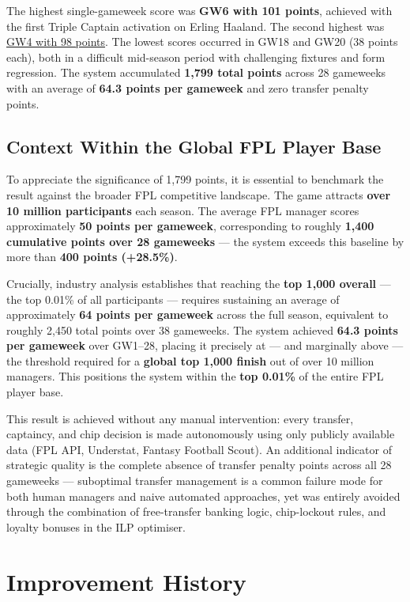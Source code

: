 The highest single-gameweek score was \textbf{GW6 with 101 points}, achieved with the first Triple Captain activation on Erling Haaland. The second highest was \underline{GW4 with 98 points}. The lowest scores occurred in GW18 and GW20 (38 points each), both in a difficult mid-season period with challenging fixtures and form regression. The system accumulated \textbf{1,799 total points} across 28 gameweeks with an average of \textbf{64.3 points per gameweek} and zero transfer penalty points.

\subsection{Context Within the Global FPL Player Base}

To appreciate the significance of 1,799 points, it is essential to benchmark the result against the broader FPL competitive landscape. The game attracts \textbf{over 10 million participants} each season. The average FPL manager scores approximately \textbf{50 points per gameweek}, corresponding to roughly \textbf{1,400 cumulative points over 28 gameweeks} — the system exceeds this baseline by more than \textbf{400 points (+28.5\%)}.

Crucially, industry analysis establishes that reaching the \textbf{top 1,000 overall} — the top 0.01\% of all participants — requires sustaining an average of approximately \textbf{64 points per gameweek} across the full season, equivalent to roughly 2,450 total points over 38 gameweeks. The system achieved \textbf{64.3 points per gameweek} over GW1--28, placing it precisely at — and marginally above — the threshold required for a \textbf{global top 1,000 finish} out of over 10 million managers. This positions the system within the \textbf{top 0.01\%} of the entire FPL player base.

This result is achieved without any manual intervention: every transfer, captaincy, and chip decision is made autonomously using only publicly available data (FPL API, Understat, Fantasy Football Scout). An additional indicator of strategic quality is the complete absence of transfer penalty points across all 28 gameweeks — suboptimal transfer management is a common failure mode for both human managers and naive automated approaches, yet was entirely avoided through the combination of free-transfer banking logic, chip-lockout rules, and loyalty bonuses in the ILP optimiser.

\section{Improvement History}

